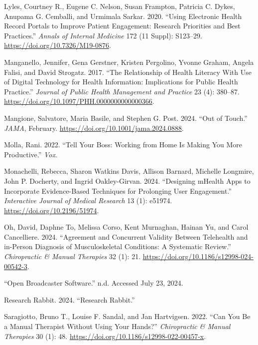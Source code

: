 \documentclass[
  letterpaper,
  DIV=11,
  numbers=noendperiod,
  oneside]{scrartcl}
\newlength{\cslhangindent}
\newenvironment{CSLReferences}[2] %
 {\begin{list}{}{%
  \setlength{\itemindent}{0pt}
  \setlength{\leftmargin}{0pt}
  \setlength{\parsep}{0pt}
  \ifodd #1
   \setlength{\leftmargin}{\cslhangindent}
   \setlength{\itemindent}{-1\cslhangindent}
  \fi
  \setlength{\itemsep}{#2\baselineskip}}}
 {\end{list}}
\begin{document}
\begin{CSLReferences}{1}{0}
Lyles, Courtney R., Eugene C. Nelson, Susan Frampton, Patricia C. Dykes,
Anupama G. Cemballi, and Urmimala Sarkar. 2020. {``Using {Electronic
Health Record Portals} to {Improve Patient Engagement}: {Research
Priorities} and {Best Practices}.''} \emph{Annals of Internal Medicine}
172 (11 Suppl): S123--29. \url{https://doi.org/10.7326/M19-0876}.

Manganello, Jennifer, Gena Gerstner, Kristen Pergolino, Yvonne Graham,
Angela Falisi, and David Strogatz. 2017. {``The {Relationship} of
{Health Literacy With Use} of {Digital Technology} for {Health
Information}: {Implications} for {Public Health Practice}.''}
\emph{Journal of Public Health Management and Practice} 23 (4): 380--87.
\url{https://doi.org/10.1097/PHH.0000000000000366}.

Mangione, Salvatore, Maria Basile, and Stephen G. Post. 2024. {``Out of
{Touch}.''} \emph{JAMA}, February.
\url{https://doi.org/10.1001/jama.2024.0888}.

Molla, Rani. 2022. {``Tell Your Boss: {Working} from Home Is Making You
More Productive.''} \emph{Vox}.

Monachelli, Rebecca, Sharon Watkins Davis, Allison Barnard, Michelle
Longmire, John P. Docherty, and Ingrid Oakley-Girvan. 2024. {``Designing
{mHealth Apps} to {Incorporate Evidence-Based Techniques} for
{Prolonging User Engagement}.''} \emph{Interactive Journal of Medical
Research} 13 (1): e51974. \url{https://doi.org/10.2196/51974}.

Oh, David, Daphne To, Melissa Corso, Kent Murnaghan, Hainan Yu, and
Carol Cancelliere. 2024. {``Agreement and Concurrent Validity Between
Telehealth and in-Person Diagnosis of Musculoskeletal Conditions: A
Systematic Review.''} \emph{Chiropractic \& Manual Therapies} 32 (1):
21. \url{https://doi.org/10.1186/s12998-024-00542-3}.

{``Open {Broadcaster Software}.''} n.d. Accessed July 23, 2024.

Research Rabbit. 2024. {``Research {Rabbit}.''}

Saragiotto, Bruno T., Louise F. Sandal, and Jan Hartvigsen. 2022. {``Can
You Be a Manual Therapist Without Using Your Hands?''}
\emph{Chiropractic \& Manual Therapies} 30 (1): 48.
\url{https://doi.org/10.1186/s12998-022-00457-x}.


\end{CSLReferences}
\end{document}
